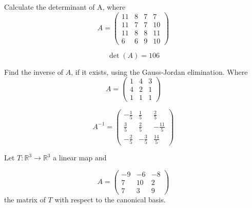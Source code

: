 \begin{questions}

\question Calculate the determinant of A, where
$$
A=\left(\begin{array}{rrrr}
11 & 8 & 7 & 7 \\
11 & 7 & 7 & 10 \\
11 & 8 & 8 & 11 \\
6 & 6 & 9 & 10
\end{array}\right)
$$

\begin{solution}
$$\det(A)=106$$
\end{solution}

\question Find the inverse of $A$, if it exists, using the Gauss-Jordan elimination. Where
$$
A=\left(\begin{array}{rrr}
1 & 4 & 3 \\
4 & 2 & 1 \\
1 & 1 & 1
\end{array}\right)
$$

\begin{solution}
$$A^{-1}=\left(\begin{array}{rrr}
-\frac{1}{5} & \frac{1}{5} & \frac{2}{5} \\
\frac{3}{5} & \frac{2}{5} & -\frac{11}{5} \\
-\frac{2}{5} & -\frac{3}{5} & \frac{14}{5}
\end{array}\right)$$
\end{solution}

\question Let $T:\mathbb{R}^3\rightarrow\mathbb{R}^3$  a linear map and
 
$$
A=\left(\begin{array}{rrr}
-9 & -6 & -8 \\
7 & 10 & 2 \\
7 & 3 & 9
\end{array}\right)
$$
the matrix of $T$ with respect to the canonical basis.
\end{questions}
